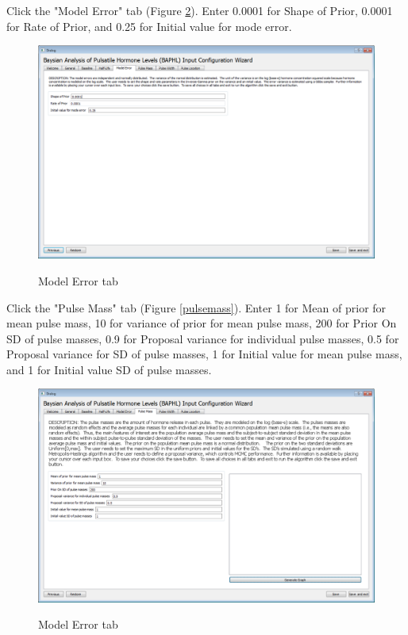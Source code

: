 \documentclass[11pt]{book}
\begin{document}
Click the "Model Error" tab (Figure \ref{modelerror}). Enter 0.0001 for Shape of Prior, 0.0001 for Rate of Prior, and 0.25 for Initial value for mode error.

\begin{figure}
  \centering
  \includegraphics[width=\textwidth]{modelerrortab.PNG}\\
  \caption{Model Error tab}\label{modelerror}
\end{figure}

Click the "Pulse Mass" tab (Figure \ref{pulsemass}). Enter 1 for Mean of prior for mean pulse mass, 10 for variance of prior for mean pulse mass, 200 for Prior On SD of pulse masses, 0.9 for Proposal variance for individual pulse masses, 0.5 for Proposal variance for SD of pulse masses, 1 for Initial value for mean pulse mass, and 1 for Initial value SD of pulse masses.

\begin{figure}
  \centering
  \includegraphics[width=\textwidth]{pulsemasstab.PNG}\\
  \caption{Model Error tab}\label{modelerror}
\end{figure}
\end{document}
